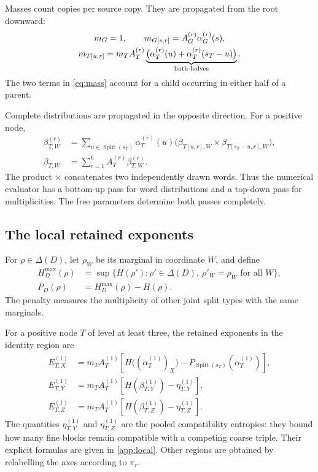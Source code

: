 \documentclass[11pt,a4paper]{article}
\DeclareMathOperator{\Split}{Split}
\begin{document}
Masses count copies per source copy. They are propagated from the root downward:
\begin{gather}
m_G=1,\qquad m_{G[s,r]}=A_G^{(r)}\alpha_G^{(r)}(s),\label{eq:root-mass}\\
m_{T[u,r]}=m_TA_T^{(r)}
\underbrace{\bigl(\alpha_T^{(r)}(u)+\alpha_T^{(r)}(s_T-u)\bigr)}_{\text{\upshape both halves}}.\label{eq:mass}
\end{gather}
The two terms in \cref{eq:mass} account for a child occurring in either half of a parent.

Complete distributions are propagated in the opposite direction. For a positive node,
\begin{align}
\beta_{T,W}^{(r)}
&=\sum_{u\in\Split(s_T)}\alpha_T^{(r)}(u)
\bigl(\beta_{T[u,r],W}\times\beta_{T[s_T-u,r],W}\bigr),\label{eq:beta-region}\\
\beta_{T,W}&=\sum_{r=1}^6 A_T^{(r)}\beta_{T,W}^{(r)}.\label{eq:beta}
\end{align}
The product $\times$ concatenates two independently drawn words. Thus the numerical evaluator has a bottom-up pass for word distributions and a top-down pass for multiplicities. The free parameters determine both passes completely.

\subsection{The local retained exponents}

For $\rho\in\Delta(D)$, let $\rho_W$ be its marginal in coordinate $W$, and define
\begin{align}
H_D^{\max}(\rho)&=\sup\{H(\rho'): \rho'\in\Delta(D),\ \rho'_W=\rho_W\text{ for all }W\},\label{eq:hmax}\\
P_D(\rho)&=H_D^{\max}(\rho)-H(\rho).\label{eq:penalty}
\end{align}
The penalty measures the multiplicity of other joint split types with the same marginals.

For a positive node $T$ of level at least three, the retained exponents in the identity region are
\begin{equation}\label{eq:local-E}
\begin{aligned}
E_{T,X}^{(1)}&=m_TA_T^{(1)}
\left[H\bigl((\alpha_T^{(1)})_X\bigr)-P_{\Split(s_T)}(\alpha_T^{(1)})\right],\\
E_{T,Y}^{(1)}&=m_TA_T^{(1)}\left[H(\beta_{T,Y}^{(1)})-\eta_{T,Y}^{(1)}\right],\\
E_{T,Z}^{(1)}&=m_TA_T^{(1)}\left[H(\beta_{T,Z}^{(1)})-\eta_{T,Z}^{(1)}\right].
\end{aligned}
\end{equation}
The quantities $\eta_{T,Y}^{(1)}$ and $\eta_{T,Z}^{(1)}$ are the pooled compatibility entropies: they bound how many fine blocks remain compatible with a competing coarse triple. Their explicit formulas are given in \cref{app:local}. Other regions are obtained by relabelling the axes according to $\pi_r$.
\end{document}
